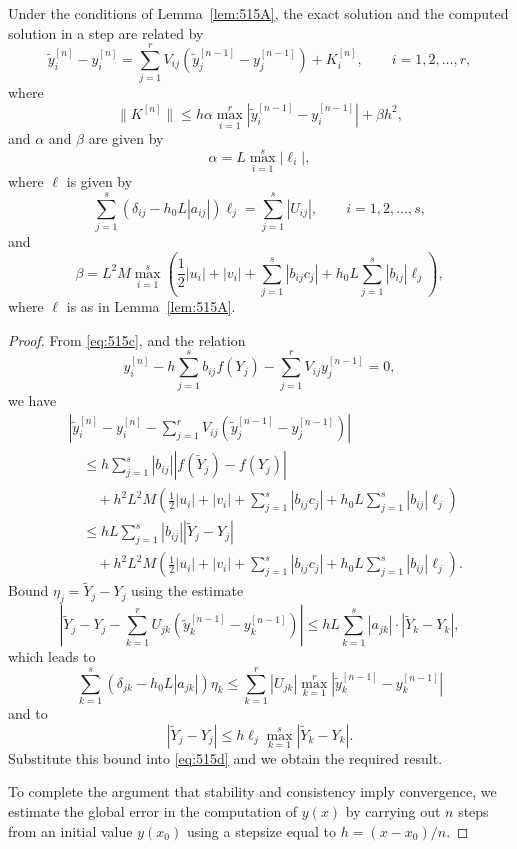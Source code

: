 \begin{lemma}

  \label{lem:515B}
Under the conditions of Lemma~\ref{lem:515A}, the exact solution and the computed solution in a step are related by
\[
\tilde{y}_i^{[n]} - y_i^{[n]} = \sum_{j=1}^{r} V_{ij} \left( \tilde{y}_j^{[n-1]} - y_j^{[n-1]} \right) + K_i^{[n]}, \qquad i = 1, 2, \dots, r,
\]
where
\[
\|K^{[n]}\| \leq h \alpha \max_{i=1}^{r} \left| \tilde{y}_i^{[n-1]} - y_i^{[n-1]} \right| + \beta h^2,
\]
and $\alpha$ and $\beta$ are given by
\[
\alpha = L \max_{i=1}^{s} |\ell_i|,
\]
where $\ell$ is given by
\[
\sum_{j=1}^{s} (\delta_{ij} - h_0 L |a_{ij}|) \ell_j = \sum_{j=1}^{s} |U_{ij}|, \qquad i = 1, 2, \dots, s,
\]
and
\[
\beta = L^2 M \max_{i=1}^{s} \left( \frac{1}{2} |u_i| + |v_i| + \sum_{j=1}^{s} |b_{ij} c_j| + h_0 L \sum_{j=1}^{s} |b_{ij}| \ell_j \right),
\]
where $\ell$ is as in Lemma~\ref{lem:515A}.
\end{lemma}

\begin{proof}
From \eqref{eq:515c}, and the relation
\[
y_i^{[n]} - h \sum_{j=1}^{s} b_{ij} f(Y_j) - \sum_{j=1}^{r} V_{ij} y_j^{[n-1]} = 0,
\]
we have
\begin{align*}
&\left| \tilde{y}_i^{[n]} - y_i^{[n]} - \sum_{j=1}^{r} V_{ij} \left( \tilde{y}_j^{[n-1]} - y_j^{[n-1]} \right) \right| \\
&\quad \leq h \sum_{j=1}^{s} |b_{ij}| \left| f(\tilde{Y}_j) - f(Y_j) \right| \\
&\qquad + h^2 L^2 M \left( \frac{1}{2} |u_i| + |v_i| + \sum_{j=1}^{s} |b_{ij} c_j| + h_0 L \sum_{j=1}^{s} |b_{ij}| \ell_j \right) \\
&\quad \leq h L \sum_{j=1}^{s} |b_{ij}| \left| \tilde{Y}_j - Y_j \right| \\
&\qquad + h^2 L^2 M \left( \frac{1}{2} |u_i| + |v_i| + \sum_{j=1}^{s} |b_{ij} c_j| + h_0 L \sum_{j=1}^{s} |b_{ij}| \ell_j \right). \tag{515d}
\end{align*}
Bound $\eta_j = \tilde{Y}_j - Y_j$ using the estimate
\[
\left| \tilde{Y}_j - Y_j - \sum_{k=1}^{r} U_{jk} \left( \tilde{y}_k^{[n-1]} - y_k^{[n-1]} \right) \right| \leq h L \sum_{k=1}^{s} |a_{jk}| \cdot \left| \tilde{Y}_k - Y_k \right|,
\]
which leads to
\[
\sum_{k=1}^{s} (\delta_{jk} - h_0 L |a_{jk}|) \eta_k \leq \sum_{k=1}^{r} |U_{jk}| \max_{k=1}^{r} \left| \tilde{y}_k^{[n-1]} - y_k^{[n-1]} \right|
\]
and to
\[
\left| \tilde{Y}_j - Y_j \right| \leq h \ell_j \max_{k=1}^{s} \left| \tilde{Y}_k - Y_k \right|.
\]
Substitute this bound into \eqref{eq:515d} and we obtain the required result.

To complete the argument that stability and consistency imply convergence, we estimate the global error in the computation of $y(x)$ by carrying out $n$ steps from an initial value $y(x_0)$ using a stepsize equal to $h = (x - x_0)/n$.
\end{proof}

